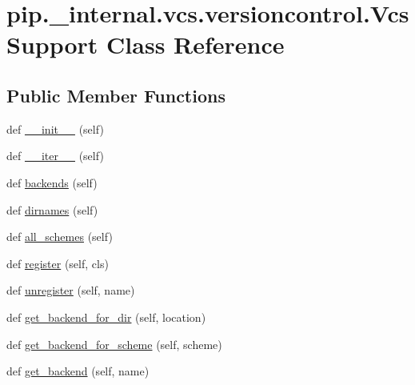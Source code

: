 \hypertarget{classpip_1_1__internal_1_1vcs_1_1versioncontrol_1_1VcsSupport}{}\section{pip.\+\_\+internal.\+vcs.\+versioncontrol.\+Vcs\+Support Class Reference}
\label{classpip_1_1__internal_1_1vcs_1_1versioncontrol_1_1VcsSupport}
\subsection*{Public Member Functions}
\begin{DoxyCompactItemize}
\item 
def \hyperlink{classpip_1_1__internal_1_1vcs_1_1versioncontrol_1_1VcsSupport_a296c167b098ace91dc0033e61cce8a3a}{\+\_\+\+\_\+init\+\_\+\+\_\+} (self)
\item 
def \hyperlink{classpip_1_1__internal_1_1vcs_1_1versioncontrol_1_1VcsSupport_a9d928e12a4ecbbe7c46d76d517d097bd}{\+\_\+\+\_\+iter\+\_\+\+\_\+} (self)
\item 
def \hyperlink{classpip_1_1__internal_1_1vcs_1_1versioncontrol_1_1VcsSupport_ad143f54b0d8d7085fd5422a98340c9b3}{backends} (self)
\item 
def \hyperlink{classpip_1_1__internal_1_1vcs_1_1versioncontrol_1_1VcsSupport_a5872060c3e14b6c4c0e2694b621ad5fc}{dirnames} (self)
\item 
def \hyperlink{classpip_1_1__internal_1_1vcs_1_1versioncontrol_1_1VcsSupport_a16dfd2480ac3a00d1b9a2167ee4e1eb6}{all\+\_\+schemes} (self)
\item 
def \hyperlink{classpip_1_1__internal_1_1vcs_1_1versioncontrol_1_1VcsSupport_a69650573cc250eef73d42fa803e8f402}{register} (self, cls)
\item 
def \hyperlink{classpip_1_1__internal_1_1vcs_1_1versioncontrol_1_1VcsSupport_a8e93029368d6a1ec2934d98af01407cd}{unregister} (self, name)
\item 
def \hyperlink{classpip_1_1__internal_1_1vcs_1_1versioncontrol_1_1VcsSupport_ab41de306742240909afa745a1b4a9214}{get\+\_\+backend\+\_\+for\+\_\+dir} (self, location)
\item 
def \hyperlink{classpip_1_1__internal_1_1vcs_1_1versioncontrol_1_1VcsSupport_a65dc846464b80cf38f5538431f9f61b4}{get\+\_\+backend\+\_\+for\+\_\+scheme} (self, scheme)
\item 
def \hyperlink{classpip_1_1__internal_1_1vcs_1_1versioncontrol_1_1VcsSupport_a45914e6fa3c97ea41b67e17612262d07}{get\+\_\+backend} (self, name)
\end{DoxyCompactItemize}
